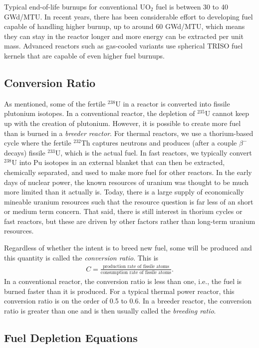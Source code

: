Typical end-of-life burnups for conventional UO$_2$ fuel is between 30 to 40 GWd/MTU. In recent years, there has been considerable effort to developing fuel capable of handling higher burnup, up to around 60 GWd/MTU, which means they can stay in the reactor longer and more energy can be extracted per unit mass. Advanced reactors such as gas-cooled variants use spherical TRISO fuel kernels that are capable of even higher fuel burnups.

\subsection{Conversion Ratio}

As mentioned, some of the fertile $^{238}$U in a reactor is converted into fissile plutonium isotopes. In a conventional reactor, the depletion of $^{235}$U cannot keep up with the creation of plutonium. However, it is possible to create more fuel than is burned in a \emph{breeder reactor}. For thermal reactors, we use a thorium-based cycle where the fertile $^{232}$Th captures neutrons and produces (after a couple $\beta^-$ decays) fissile $^{233}$U, which is the actual fuel. In fast reactors, we typically convert $^{238}$U into Pu isotopes in an external blanket that can then be extracted, chemically separated, and used to make more fuel for other reactors. In the early days of nuclear power, the known resources of uranium was thought to be much more limited than it actually is. Today, there is a large supply of economically mineable uranium resources such that the resource question is far less of an short or medium term concern. That said, there is still interest in thorium cycles or fast reactors, but these are driven by other factors rather than long-term uranium resources.

Regardless of whether the intent is to breed new fuel, some will be produced and this quantity is called the \emph{conversion ratio}. This is
\begin{align}
  C = \frac{\text{production rate of fissile atoms}}{\text{consumption rate of fissile atoms}} .
\end{align}
In a conventional reactor, the conversion ratio is less than one, i.e., the fuel is burned faster than it is produced. For a typical thermal power reactor, this conversion ratio is on the order of 0.5 to 0.6. In a breeder reactor, the conversion ratio is greater than one and is then usually called the \emph{breeding ratio}.

\subsection{Fuel Depletion Equations} \label{Sec:kinetics_fuelDepletionEquations}

